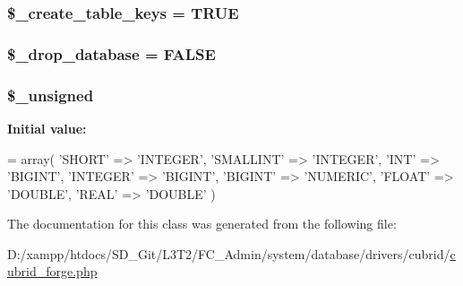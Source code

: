 \subsubsection[{\$\+\_\+create\+\_\+table\+\_\+keys}]{\setlength{\rightskip}{0pt plus 5cm}\$\+\_\+create\+\_\+table\+\_\+keys = T\+R\+U\+E\hspace{0.3cm}{\ttfamily [protected]}}\label{class_c_i___d_b__cubrid__forge_a73e07acdd35c948ad353903c2827af6e}
\hypertarget{class_c_i___d_b__cubrid__forge_a8305b12fc17f6f87778260ebdff287b4}{}
\subsubsection[{\$\+\_\+drop\+\_\+database}]{\setlength{\rightskip}{0pt plus 5cm}\$\+\_\+drop\+\_\+database = F\+A\+L\+S\+E\hspace{0.3cm}{\ttfamily [protected]}}\label{class_c_i___d_b__cubrid__forge_a8305b12fc17f6f87778260ebdff287b4}
\hypertarget{class_c_i___d_b__cubrid__forge_aae977ae6d61fa183f0b25422b6ddc31c}{}
\subsubsection[{\$\+\_\+unsigned}]{\setlength{\rightskip}{0pt plus 5cm}\$\+\_\+unsigned\hspace{0.3cm}{\ttfamily [protected]}}\label{class_c_i___d_b__cubrid__forge_aae977ae6d61fa183f0b25422b6ddc31c}
{\bfseries Initial value\+:}
\begin{DoxyCode}
= array(
        \textcolor{stringliteral}{'SHORT'}     => \textcolor{stringliteral}{'INTEGER'},
        \textcolor{stringliteral}{'SMALLINT'}  => \textcolor{stringliteral}{'INTEGER'},
        \textcolor{stringliteral}{'INT'}       => \textcolor{stringliteral}{'BIGINT'},
        \textcolor{stringliteral}{'INTEGER'}   => \textcolor{stringliteral}{'BIGINT'},
        \textcolor{stringliteral}{'BIGINT'}    => \textcolor{stringliteral}{'NUMERIC'},
        \textcolor{stringliteral}{'FLOAT'}     => \textcolor{stringliteral}{'DOUBLE'},
        \textcolor{stringliteral}{'REAL'}      => \textcolor{stringliteral}{'DOUBLE'}
    )
\end{DoxyCode}


The documentation for this class was generated from the following file\+:\begin{DoxyCompactItemize}
\item 
D\+:/xampp/htdocs/\+S\+D\+\_\+\+Git/\+L3\+T2/\+F\+C\+\_\+\+Admin/system/database/drivers/cubrid/\hyperlink{cubrid__forge_8php}{cubrid\+\_\+forge.\+php}\end{DoxyCompactItemize}
